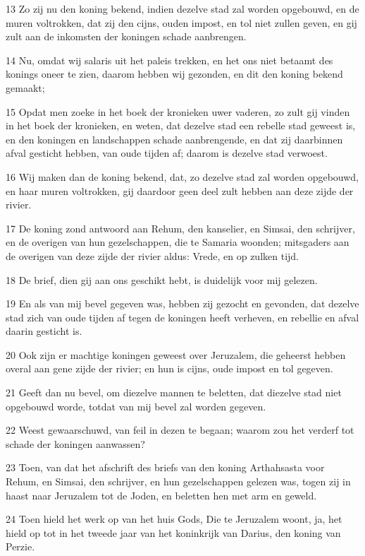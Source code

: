 \par 13 Zo zij nu den koning bekend, indien dezelve stad zal worden opgebouwd, en de muren voltrokken, dat zij den cijns, ouden impost, en tol niet zullen geven, en gij zult aan de inkomsten der koningen schade aanbrengen.
\par 14 Nu, omdat wij salaris uit het paleis trekken, en het ons niet betaamt des konings oneer te zien, daarom hebben wij gezonden, en dit den koning bekend gemaakt;
\par 15 Opdat men zoeke in het boek der kronieken uwer vaderen, zo zult gij vinden in het boek der kronieken, en weten, dat dezelve stad een rebelle stad geweest is, en den koningen en landschappen schade aanbrengende, en dat zij daarbinnen afval gesticht hebben, van oude tijden af; daarom is dezelve stad verwoest.
\par 16 Wij maken dan de koning bekend, dat, zo dezelve stad zal worden opgebouwd, en haar muren voltrokken, gij daardoor geen deel zult hebben aan deze zijde der rivier.
\par 17 De koning zond antwoord aan Rehum, den kanselier, en Simsai, den schrijver, en de overigen van hun gezelschappen, die te Samaria woonden; mitsgaders aan de overigen van deze zijde der rivier aldus: Vrede, en op zulken tijd.
\par 18 De brief, dien gij aan ons geschikt hebt, is duidelijk voor mij gelezen.
\par 19 En als van mij bevel gegeven was, hebben zij gezocht en gevonden, dat dezelve stad zich van oude tijden af tegen de koningen heeft verheven, en rebellie en afval daarin gesticht is.
\par 20 Ook zijn er machtige koningen geweest over Jeruzalem, die geheerst hebben overal aan gene zijde der rivier; en hun is cijns, oude impost en tol gegeven.
\par 21 Geeft dan nu bevel, om diezelve mannen te beletten, dat diezelve stad niet opgebouwd worde, totdat van mij bevel zal worden gegeven.
\par 22 Weest gewaarschuwd, van feil in dezen te begaan; waarom zou het verderf tot schade der koningen aanwassen?
\par 23 Toen, van dat het afschrift des briefs van den koning Arthahsasta voor Rehum, en Simsai, den schrijver, en hun gezelschappen gelezen was, togen zij in haast naar Jeruzalem tot de Joden, en beletten hen met arm en geweld.
\par 24 Toen hield het werk op van het huis Gods, Die te Jeruzalem woont, ja, het hield op tot in het tweede jaar van het koninkrijk van Darius, den koning van Perzie.

